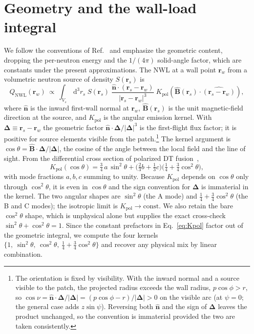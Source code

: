 \documentclass[11pt]{article}
\newcommand{\rs}{\bm{r}_s}
\newcommand{\rw}{\bm{r}_w}
\newcommand{\Del}{\bm{\Delta}}
\newcommand{\nhat}{\hat{\bm{n}}}
\newcommand{\Bhat}{\hat{\bm{B}}}
\newcommand{\Kpol}{K_{\mathrm{pol}}}
\newcommand{\NWL}{\mathrm{NWL}}
\newcommand{\dd}{\,\mathrm{d}}
\begin{document}
\section{Geometry and the wall-load integral}
\label{sec:geometry}

We follow the conventions of Ref.~\cite{schwartz2025} and emphasize the geometric content, dropping the per-neutron energy and the $1/(4\pi)$ solid-angle factor, which are constants under the present approximations. The NWL at a wall point $\rw$ from a volumetric neutron source of density $S(\rs)$ is
\begin{equation}
Q_{\NWL}(\rw)\ \propto\ \int_{V_s} \dd^3 r_s\; S(\rs)\;
\frac{\nhat\cdot(\rs-\rw)}{\lvert \rs-\rw\rvert^{3}}\;
\Kpol\!\left(\Bhat(\rs)\cdot\widehat{(\rs-\rw)}\right),
\label{eq:NWLvol}
\end{equation}
where $\nhat$ is the inward first-wall normal at $\rw$, $\Bhat(\rs)$ is the unit magnetic-field direction at the source, and $\Kpol$ is the angular emission kernel. With $\Del\equiv\rs-\rw$ the geometric factor $\nhat\cdot\Del/\lvert\Del\rvert^{3}$ is the first-flight flux factor; it is positive for source elements visible from the patch.\footnote{The orientation is fixed by visibility. With the inward normal and a source visible to the patch, the projected radius exceeds the wall radius, $p\cos\phi>r$, so $\cos\nu=\nhat\cdot\Del/\lvert\Del\rvert=(p\cos\phi-r)/\lvert\Del\rvert>0$ on the visible arc (at $\psi=0$; the general case adds $z\sin\psi$). Reversing both $\nhat$ and the sign of $\Del$ leaves the product unchanged, so the convention is immaterial provided the two are taken consistently.} The kernel argument is $\cos\theta=\Bhat\cdot\Del/\lvert\Del\rvert$, the cosine of the angle between the local field and the line of sight. From the differential cross section of polarized DT fusion~\cite{kulsrud1982,schwartz2025},
\begin{equation}
\Kpol(\cos\theta)=\tfrac{3}{4}\,a\,\sin^2\theta+\Big(\tfrac{2}{3}b+\tfrac{1}{3}c\Big)\Big(\tfrac{1}{4}+\tfrac{3}{4}\cos^2\theta\Big),
\label{eq:Kpol}
\end{equation}
with mode fractions $a,b,c$ summing to unity. Because $\Kpol$ depends on $\cos\theta$ only through $\cos^2\theta$, it is even in $\cos\theta$ and the sign convention for $\Del$ is immaterial in the kernel. The two angular shapes are $\sin^2\theta$ (the A mode) and $\tfrac14+\tfrac34\cos^2\theta$ (the B and C modes); the isotropic limit is $\Kpol\to\mathrm{const}$. We also retain the bare $\cos^2\theta$ shape, which is unphysical alone but supplies the exact cross-check $\sin^2\theta+\cos^2\theta=1$. Since the constant prefactors in Eq.~\eqref{eq:Kpol} factor out of the geometric integral, we compute the four kernels $\{1,\ \sin^2\theta,\ \cos^2\theta,\ \tfrac14+\tfrac34\cos^2\theta\}$ and recover any physical mix by linear combination.
\end{document}

